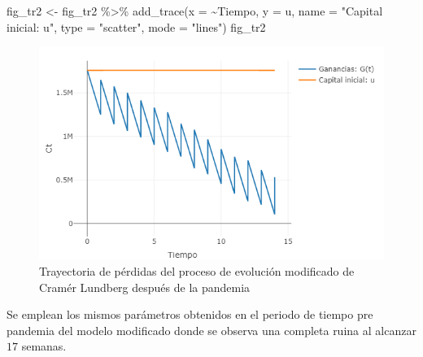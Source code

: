 \documentclass[
  us-letterpaper,
]{scrreprt}
\newenvironment{Shaded}{\begin{snugshade}}{\end{snugshade}}
\newcommand{\AttributeTok}[1]{\textcolor[rgb]{0.40,0.45,0.13}{#1}}
\newcommand{\FunctionTok}[1]{\textcolor[rgb]{0.28,0.35,0.67}{#1}}
\newcommand{\NormalTok}[1]{\textcolor[rgb]{0.00,0.23,0.31}{#1}}
\newcommand{\OtherTok}[1]{\textcolor[rgb]{0.00,0.23,0.31}{#1}}
\newcommand{\SpecialCharTok}[1]{\textcolor[rgb]{0.37,0.37,0.37}{#1}}
\newcommand{\StringTok}[1]{\textcolor[rgb]{0.13,0.47,0.30}{#1}}
\theoremstyle{definition}
\theoremstyle{plain}
\theoremstyle{plain}
\theoremstyle{remark}
\begin{document}
\begin{Shaded}
\begin{Highlighting}[]
\NormalTok{fig\_tr2 }\OtherTok{\textless{}{-}}\NormalTok{ fig\_tr2 }\SpecialCharTok{\%\textgreater{}\%} \FunctionTok{add\_trace}\NormalTok{(}\AttributeTok{x =} \SpecialCharTok{\textasciitilde{}}\NormalTok{Tiempo, }\AttributeTok{y =}\NormalTok{ u,}
        \AttributeTok{name =} \StringTok{"Capital inicial: u"}\NormalTok{, }
        \AttributeTok{type =} \StringTok{"scatter"}\NormalTok{, }\AttributeTok{mode =} \StringTok{"lines"}\NormalTok{)}
\NormalTok{fig\_tr2}
\end{Highlighting}
\end{Shaded}

\begin{figure}

\includegraphics[width=6.25in,height=\textheight]{trayectoria2pdf.png}

\caption{\label{fig-fig-trayectoria2pdf}Trayectoria de pérdidas del
proceso de evolución modificado de Cramér Lundberg después de la
pandemia}

\end{figure}%

Se emplean los mismos parámetros obtenidos en el periodo de tiempo pre
pandemia del modelo modificado donde se observa una completa ruina al
alcanzar \(17\) semanas.
\end{document}
